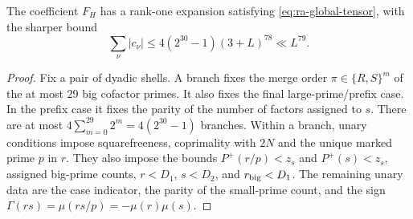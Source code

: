 \begin{lemma}\label{lem:ra-tensor}
The coefficient \(F_H\) has a rank-one expansion satisfying
\eqref{eq:ra-global-tensor}, with the sharper bound
\begin{equation}\label{eq:ra-tensor-norm}
 \sum_\nu|c_\nu|
 \le4(2^{30}-1)(3+L)^{78}\ll L^{79}.
\end{equation}
\end{lemma}
\begin{proof}
Fix a pair of dyadic shells. A branch fixes the merge order
\(\pi\in\{R,S\}^m\) of the at most 29 big cofactor primes. It also fixes the final
large-prime/prefix case.
In the prefix case it fixes the parity of the number
of factors assigned to \(s\). There are at most
\(4\sum_{m=0}^{29}2^m=4(2^{30}-1)\) branches. Within a branch, unary
conditions impose squarefreeness, coprimality with \(2N\) and the unique
marked prime \(p\) in \(r\). They also impose the bounds \(P^+(r/p)<z_s\) and
\(P^+(s)<z_s\), assigned big-prime counts, \(r<D_1\), \(s<D_2\), and
\(r_{\rm big}<D_1\). The remaining unary data are the case indicator, the parity of the small-prime
count, and the sign \(\Gamma(rs)=\mu(rs/p)=-\mu(r)\mu(s)\).


\end{proof}
